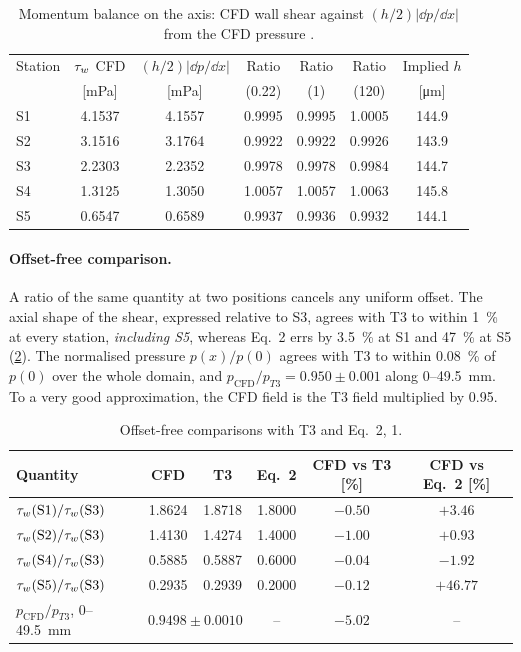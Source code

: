 \begin{table}[htbp]
\centering
\caption{Momentum balance on the axis: CFD wall shear against $(h/2)|\dd p/\dd x|$ from the CFD pressure \tagC.}
\label{tab:momentum}
\small
\begin{tabular}{@{}lcccccc@{}}
\toprule
Station & $\tau_{w}$ CFD & $(h/2)|\dd p/\dd x|$ & Ratio & Ratio & Ratio & Implied $h$\\
 & [mPa] & [mPa] & (0.22) & (1) & (120) & [\si{\micro\metre}]\\
\midrule
S1 & 4.1537 & 4.1557 & 0.9995 & 0.9995 & 1.0005 & 144.9\\
S2 & 3.1516 & 3.1764 & 0.9922 & 0.9922 & 0.9926 & 143.9\\
S3 & 2.2303 & 2.2352 & 0.9978 & 0.9978 & 0.9984 & 144.7\\
S4 & 1.3125 & 1.3050 & 1.0057 & 1.0057 & 1.0063 & 145.8\\
S5 & 0.6547 & 0.6589 & 0.9937 & 0.9936 & 0.9932 & 144.1\\
\bottomrule
\end{tabular}
\end{table}

\paragraph{Offset-free comparison.} A ratio of the same quantity at two positions cancels any uniform offset. The axial shape of the shear, expressed relative to S3, agrees with T3 to within \SI{1}{\percent} at every station, \emph{including S5}, whereas Eq.~2 errs by \SI{+3.5}{\percent} at S1 and \SI{+47}{\percent} at S5 (\cref{tab:offset_free}). The normalised pressure $p(x)/p(0)$ agrees with T3 to within \SI{0.08}{\percent} of $p(0)$ over the whole domain, and $p_{\mathrm{CFD}}/p_{T3}=0.950\pm0.001$ along 0--\SI{49.5}{mm}. To a very good approximation, the CFD field is the T3 field multiplied by 0.95.

\begin{table}[htbp]
\centering
\caption{Offset-free comparisons with T3 and Eq.~2, \SI{1}{\uLmin}.}
\label{tab:offset_free}
\small
\begin{tabular}{@{}lccccc@{}}
\toprule
Quantity & CFD & T3 & Eq.~2 & CFD vs T3 [\%] & CFD vs Eq.~2 [\%]\\
\midrule
$\tau_{w}(\mathrm{S1})/\tau_{w}(\mathrm{S3})$ & 1.8624 & 1.8718 & 1.8000 & $-0.50$ & $+3.46$\\
$\tau_{w}(\mathrm{S2})/\tau_{w}(\mathrm{S3})$ & 1.4130 & 1.4274 & 1.4000 & $-1.00$ & $+0.93$\\
$\tau_{w}(\mathrm{S4})/\tau_{w}(\mathrm{S3})$ & 0.5885 & 0.5887 & 0.6000 & $-0.04$ & $-1.92$\\
$\tau_{w}(\mathrm{S5})/\tau_{w}(\mathrm{S3})$ & 0.2935 & 0.2939 & 0.2000 & $-0.12$ & $+46.77$\\
$p_{\mathrm{CFD}}/p_{T3}$, 0--\SI{49.5}{mm} & \multicolumn{2}{c}{$0.9498\pm0.0010$} & -- & $-5.02$ & --\\
\bottomrule
\end{tabular}
\end{table}

